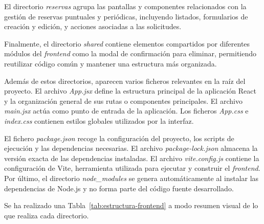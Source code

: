 El directorio \textit{reservas} agrupa las pantallas y componentes relacionados con la gestión de reservas puntuales y periódicas, incluyendo listados, formularios de creación y edición, y acciones asociadas a las solicitudes.

Finalmente, el directorio \textit{shared} contiene elementos compartidos por diferentes módulos del \textit{frontend} como la modal de confirmación para eliminar, permitiendo reutilizar código común y mantener una estructura más organizada.

Además de estos directorios, aparecen varios ficheros relevantes en la raíz del proyecto. El archivo \textit{App.jsx} define la estructura principal de la aplicación React y la organización general de sus rutas o componentes principales. El archivo \textit{main.jsx} actúa como punto de entrada de la aplicación. Los ficheros \textit{App.css} e \textit{index.css} contienen estilos globales utilizados por la interfaz.

El fichero \textit{package.json} recoge la configuración del proyecto, los scripts de ejecución y las dependencias necesarias. El archivo \textit{package-lock.json} almacena la versión exacta de las dependencias instaladas. El archivo \textit{vite.config.js} contiene la configuración de Vite, herramienta utilizada para ejecutar y construir el \textit{frontend}. Por último, el directorio \textit{node\_modules} se genera automáticamente al instalar las dependencias de Node.js y no forma parte del código fuente desarrollado.

Se ha realizado una Tabla~\ref{tab:estructura-frontend} a modo resumen visual de lo que realiza cada directorio.

